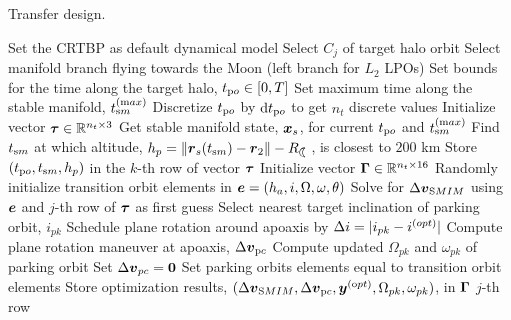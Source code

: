 \begin{algorithm}[!b]
	\caption{Transfer design.}\label{alg:TransferDeign}
	\begin{algorithmic}[]
		\State Set the CRTBP as default dynamical model
		\State Select $C_j$ of target halo orbit 
		\State Select manifold branch flying towards the Moon (\ie left branch for $L_2$ LPOs)
		\EndProcedure
		\State Set bounds for the time along the target halo, $t_{\textrm po}\in\left[0,T\right]$ 
		\State Set maximum time along the stable manifold, $t^{(\textrm max)}_{\textrm sm}$
		\State Discretize $t_{\textrm po}$ by $\textrm{d}t_{\textrm po}$ to get $n_t$ discrete values
		\State Initialize vector $\boldsymbol{\tau}\in\mathbb{R}^{n_t\times3}$
		\State Get stable manifold state, $\boldsymbol{x}_s$, for current $t_{\textrm po}$ and $t^{(\textrm max)}_{\textrm sm}$ 
		\State Find $t_{\textrm sm}$ at which altitude, $h_p = \|\vect{r}_s(t_{\textrm sm})-\vect{r}_2\|-R_{\leftmoon}$, is closest to $200$ km
		\State Store $(t_{\textrm po},t_{\textrm sm},h_p)$ in the $k$-th row of vector $\boldsymbol{\tau}$
		\EndFor
		\EndProcedure
		\State Initialize vector $\boldsymbol{\Gamma}\in\mathbb{R}^{n_t\times16}$
		\Repeat
		\State Randomly initialize transition orbit elements in $\boldsymbol{e} = (h_a,i,\Omega,\omega,\theta)$
		\State Solve for $\Delta\boldsymbol{v}_{\textrm SMIM}$ using $\boldsymbol{e}$ and $j$-th row of $\boldsymbol{\tau}$ as first guess 
		\State Select nearest target inclination of parking orbit, $i_{pk}$ 
		\State Schedule plane rotation around apoaxis by $\Delta i = |i_{pk}-i^{\textrm (opt)}|$
		\State Compute plane rotation maneuver at apoaxis, $\Delta\boldsymbol{v}_{\textrm pc}$
		\State Compute updated $\Omega_{pk}$ and $\omega_{pk}$ of parking orbit
		\Else
		\State Set $\Delta\boldsymbol{v}_{pc} = \boldsymbol{0}$
		\State Set parking orbits elements equal to transition orbit elements
		\EndIf
		\State Store optimization results, $(\Delta\boldsymbol{v}_{\textrm SMIM},\Delta\boldsymbol{v}_{\textrm pc},\boldsymbol{y}^{(\textrm opt)},\Omega_{pk},\omega_{pk})$, in $\boldsymbol{\Gamma}$ $j$-th row
		\EndLoop
		\EndProcedure
	\end{algorithmic}
\end{algorithm}
% 

